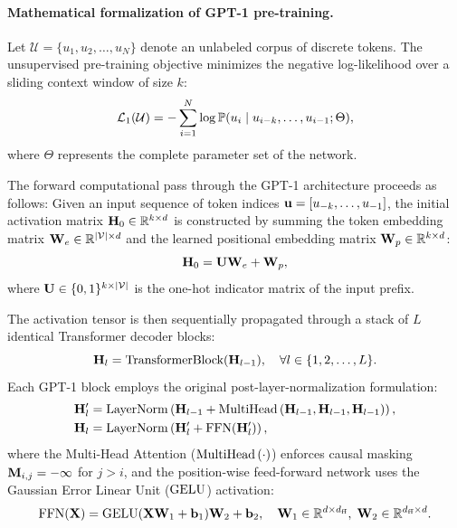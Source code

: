 \documentclass[../../main.tex]{subfiles}
\begin{document}
\paragraph{Mathematical formalization of GPT-1 pre-training.}
Let $\mathcal{U} = \{u_1, u_2, \dots, u_N\}$ denote an unlabeled corpus of discrete tokens. The unsupervised pre-training objective minimizes the negative log-likelihood over a sliding context window of size $k$:
\begin{equation}
\label{eq:gpt1_unsupervised_loss}
\mathcal{L}_1(\mathcal{U}) = -\sum_{i=1}^N \log \mathbb{P}(u_i \mid u_{i-k}, \dots, u_{i-1}; \Theta),
\end{equation}
where $\Theta$ represents the complete parameter set of the network.

The forward computational pass through the GPT-1 architecture proceeds as follows:
Given an input sequence of token indices $\mathbf{u} = [u_{-k}, \dots, u_{-1}]$, the initial activation matrix $\mathbf{H}_0 \in \mathbb{R}^{k \times d}$ is constructed by summing the token embedding matrix $\mathbf{W}_e \in \mathbb{R}^{|\mathcal{V}| \times d}$ and the learned positional embedding matrix $\mathbf{W}_p \in \mathbb{R}^{k \times d}$:
\begin{equation}
\label{eq:gpt1_input_representation}
\mathbf{H}_0 = \mathbf{U} \mathbf{W}_e + \mathbf{W}_p,
\end{equation}
where $\mathbf{U} \in \{0, 1\}^{k \times |\mathcal{V}|}$ is the one-hot indicator matrix of the input prefix.

The activation tensor is then sequentially propagated through a stack of $L$ identical Transformer decoder blocks:
\begin{equation}
\label{eq:gpt1_layer_pass}
\mathbf{H}_l = \text{TransformerBlock}(\mathbf{H}_{l-1}), \quad \forall l \in \{1, 2, \dots, L\}.
\end{equation}
Each GPT-1 block employs the original post-layer-normalization formulation:
\begin{align}
\mathbf{H}'_l &= \operatorname{\mathrm{LayerNorm}}\left( \mathbf{H}_{l-1} + \operatorname{MultiHead}\left(\mathbf{H}_{l-1}, \mathbf{H}_{l-1}, \mathbf{H}_{l-1}\right) \right), \\
\mathbf{H}_l &= \operatorname{\mathrm{LayerNorm}}\left( \mathbf{H}'_l + \text{FFN}(\mathbf{H}'_l) \right),
\end{align}
where the Multi-Head Attention ($\operatorname{MultiHead}\left(\cdot\right)$) enforces causal masking $\mathbf{M}_{i,j} = -\infty$ for $j > i$, and the position-wise feed-forward network uses the Gaussian Error Linear Unit ($\operatorname{\mathrm{GELU}}$) activation:
\begin{equation}
\text{FFN}(\mathbf{X}) = \operatorname{\mathrm{GELU}}(\mathbf{X} \mathbf{W}_1 + \mathbf{b}_1) \mathbf{W}_2 + \mathbf{b}_2, \quad \mathbf{W}_1 \in \mathbb{R}^{d \times d_{\text{ff}}}, \; \mathbf{W}_2 \in \mathbb{R}^{d_{\text{ff}} \times d}.
\end{equation}
\end{document}
